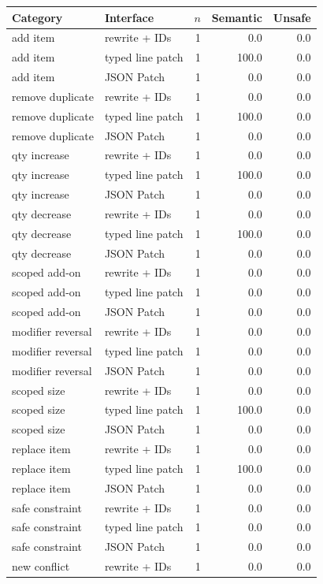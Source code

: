 \begin{tabular}{llrrr}
\toprule
Category & Interface & $n$ & Semantic & Unsafe \\
\midrule
add item & rewrite + IDs & 1 & 0.0 & 0.0 \\
add item & typed line patch & 1 & 100.0 & 0.0 \\
add item & JSON Patch & 1 & 0.0 & 0.0 \\
remove duplicate & rewrite + IDs & 1 & 0.0 & 0.0 \\
remove duplicate & typed line patch & 1 & 100.0 & 0.0 \\
remove duplicate & JSON Patch & 1 & 0.0 & 0.0 \\
qty increase & rewrite + IDs & 1 & 0.0 & 0.0 \\
qty increase & typed line patch & 1 & 100.0 & 0.0 \\
qty increase & JSON Patch & 1 & 0.0 & 0.0 \\
qty decrease & rewrite + IDs & 1 & 0.0 & 0.0 \\
qty decrease & typed line patch & 1 & 100.0 & 0.0 \\
qty decrease & JSON Patch & 1 & 0.0 & 0.0 \\
scoped add-on & rewrite + IDs & 1 & 0.0 & 0.0 \\
scoped add-on & typed line patch & 1 & 0.0 & 0.0 \\
scoped add-on & JSON Patch & 1 & 0.0 & 0.0 \\
modifier reversal & rewrite + IDs & 1 & 0.0 & 0.0 \\
modifier reversal & typed line patch & 1 & 0.0 & 0.0 \\
modifier reversal & JSON Patch & 1 & 0.0 & 0.0 \\
scoped size & rewrite + IDs & 1 & 0.0 & 0.0 \\
scoped size & typed line patch & 1 & 100.0 & 0.0 \\
scoped size & JSON Patch & 1 & 0.0 & 0.0 \\
replace item & rewrite + IDs & 1 & 0.0 & 0.0 \\
replace item & typed line patch & 1 & 100.0 & 0.0 \\
replace item & JSON Patch & 1 & 0.0 & 0.0 \\
safe constraint & rewrite + IDs & 1 & 0.0 & 0.0 \\
safe constraint & typed line patch & 1 & 0.0 & 0.0 \\
safe constraint & JSON Patch & 1 & 0.0 & 0.0 \\
new conflict & rewrite + IDs & 1 & 0.0 & 0.0 \\

\end{tabular}

